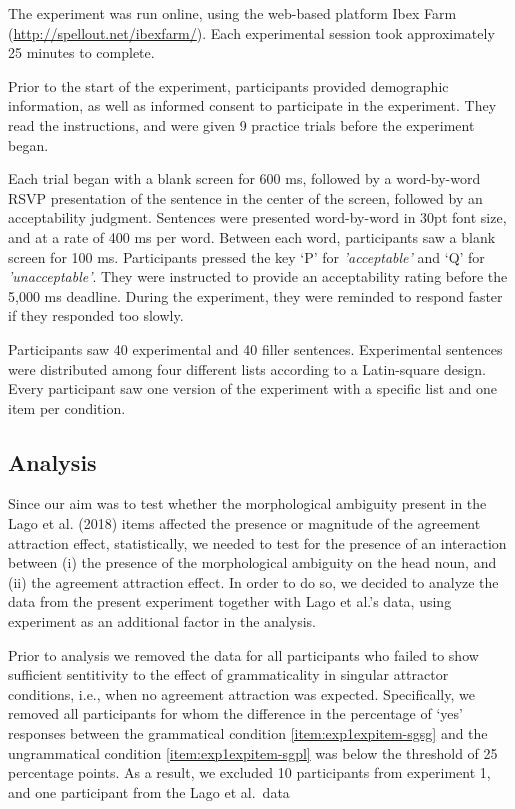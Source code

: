 \documentclass[
  english,
  doc,floatsintext]{apa6}
\begin{document}
The experiment was run online, using the web-based platform Ibex Farm (\url{http://spellout.net/ibexfarm/}). Each experimental session took approximately 25 minutes to complete.

Prior to the start of the experiment, participants provided demographic information, as well as informed consent to participate in the experiment. They read the instructions, and were given 9 practice trials before the experiment began.

Each trial began with a blank screen for 600 ms, followed by a word-by-word RSVP presentation of the sentence in the center of the screen, followed by an acceptability judgment.
Sentences were presented word-by-word in 30pt font size, and at a rate of 400 ms per word. Between each word, participants saw a blank screen for 100 ms. Participants pressed the key `P' for \textit{'acceptable'} and `Q' for \textit{'unacceptable'}. They were instructed to provide an acceptability rating before the 5,000 ms deadline. During the experiment, they were reminded to respond faster if they responded too slowly.

Participants saw 40 experimental and 40 filler sentences. Experimental sentences were distributed among four different lists according to a Latin-square design. Every participant saw one version of the experiment with a specific list and one item per condition.

\hypertarget{analysis}{%
\subsection{Analysis}\label{analysis}}

Since our aim was to test whether the morphological ambiguity present in the Lago et al. (2018) items affected the presence or magnitude of the agreement attraction effect, statistically, we needed to test for the presence of an interaction between
(i) the presence of the morphological ambiguity on the head noun, and
(ii) the agreement attraction effect.
In order to do so, we decided to analyze the data from the present experiment together with Lago et al.'s data, using experiment as an additional factor in the analysis.

Prior to analysis we removed the data for all participants who failed to show sufficient sentitivity to the effect of grammaticality in singular attractor conditions, i.e., when no agreement attraction was expected. Specifically, we removed all participants for whom the difference in the percentage of `yes' responses between the grammatical condition \ref{item:exp1expitem-sgsg} and the ungrammatical condition \ref{item:exp1expitem-sgpl} was below the threshold of 25 percentage points. As a result, we excluded 10 participants from experiment 1, and one participant from the Lago et al.~data
\end{document}

